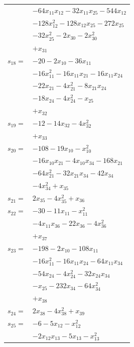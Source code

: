 \begin{longtable}{@{}r@{\;}l@{}}
 & \(\displaystyle -64x_{11}x_{12} -32x_{11}x_{25} -544x_{12}\) \\
 & \(\displaystyle -128x_{12}^{2} -128x_{12}x_{25} -272x_{25}\) \\
 & \(\displaystyle -32x_{25}^{2} -2x_{30} -2x_{30}^{2}\) \\
 & \(\displaystyle +x_{31}\) \\[3pt]
\(s_{18}=\) & \(\displaystyle -20 -2x_{10} -36x_{11}\) \\
 & \(\displaystyle -16x_{11}^{2} -16x_{11}x_{21} -16x_{11}x_{24}\) \\
 & \(\displaystyle -22x_{21} -4x_{21}^{2} -8x_{21}x_{24}\) \\
 & \(\displaystyle -18x_{24} -4x_{24}^{2} -x_{25}\) \\
 & \(\displaystyle +x_{32}\) \\[3pt]
\(s_{19}=\) & \(\displaystyle -12 -14x_{32} -4x_{32}^{2}\) \\
 & \(\displaystyle +x_{33}\) \\[3pt]
\(s_{20}=\) & \(\displaystyle -108 -19x_{10} -x_{10}^{2}\) \\
 & \(\displaystyle -16x_{10}x_{21} -4x_{10}x_{34} -168x_{21}\) \\
 & \(\displaystyle -64x_{21}^{2} -32x_{21}x_{34} -42x_{34}\) \\
 & \(\displaystyle -4x_{34}^{2} +x_{35}\) \\[3pt]
\(s_{21}=\) & \(\displaystyle 2x_{35} -4x_{35}^{2} +x_{36}\) \\[3pt]
\(s_{22}=\) & \(\displaystyle -30 -11x_{11} -x_{11}^{2}\) \\
 & \(\displaystyle -4x_{11}x_{36} -22x_{36} -4x_{36}^{2}\) \\
 & \(\displaystyle +x_{37}\) \\[3pt]
\(s_{23}=\) & \(\displaystyle -198 -2x_{10} -108x_{11}\) \\
 & \(\displaystyle -16x_{11}^{2} -16x_{11}x_{24} -64x_{11}x_{34}\) \\
 & \(\displaystyle -54x_{24} -4x_{24}^{2} -32x_{24}x_{34}\) \\
 & \(\displaystyle -x_{25} -232x_{34} -64x_{34}^{2}\) \\
 & \(\displaystyle +x_{38}\) \\[3pt]
\(s_{24}=\) & \(\displaystyle 2x_{38} -4x_{38}^{2} +x_{39}\) \\[3pt]
\(s_{25}=\) & \(\displaystyle -6 -5x_{12} -x_{12}^{2}\) \\
 & \(\displaystyle -2x_{12}x_{13} -5x_{13} -x_{13}^{2}\) \\

\end{longtable}
